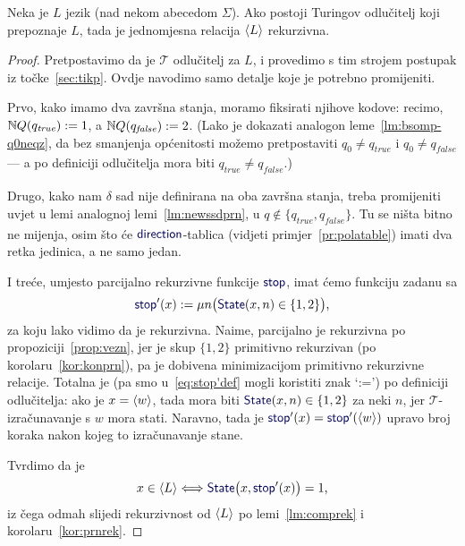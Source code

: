 \begin{teorem}[{name=[rekurzivnost Turing-odlučivog jezika]}]\label{tm:oikr}
    Neka je $L$ jezik (nad nekom abecedom $\Sigma$). Ako postoji Turingov odlučitelj koji prepoznaje $L$, tada je jednomjesna relacija $\langle L\rangle$ rekurzivna.
\end{teorem}
\begin{proof}
Pretpostavimo da je $\mathcal T$ odlučitelj za $L$, i provedimo s tim strojem postupak iz točke~\ref{sec:tikp}. Ovdje navodimo samo detalje koje je potrebno promijeniti.

Prvo, kako imamo dva završna stanja, moramo fiksirati njihove kodove: recimo, ${\mathbb N} Q(q_\mathit{true}):=1$, a ${\mathbb N} Q(q_\mathit{false}):=2$. (Lako je dokazati analogon leme~\ref{lm:bsomp-q0neqz}, da bez smanjenja općenitosti možemo pretpostaviti $q_0\not=q_\mathit{true}$ i $q_0\not=q_\mathit{false}$ --- a po definiciji odlučitelja mora biti $q_\mathit{true}\not=q_\mathit{false}$.)

    Drugo, kako nam $\delta$ sad nije definirana na oba završna stanja, treba promijeniti uvjet u lemi analognoj lemi~\ref{lm:newssdprn}, u $q\not\in\{q_\mathit{true},q_\mathit{false}\}$. Tu se ništa bitno ne mijenja, osim što će $\f{direction}$-tablica (vidjeti primjer~\ref{pr:polatable}) imati dva retka jedinica, a ne samo jedan.

I treće, umjesto parcijalno rekurzivne funkcije $\f{stop}$, imat ćemo funkciju zadanu sa
\begin{equation}\label{eq:stop'def}
    \f{stop}'(x):=\mu n\bigl(\f{State}(x,n)\in\{1,2\}\bigr)\text,
\end{equation}
za koju lako vidimo da je rekurzivna. Naime, parcijalno je rekurzivna po propoziciji~\ref{prop:vezn}, jer je skup $\{1,2\}$ primitivno rekurzivan (po korolaru~\ref{kor:konprn}), pa je dobivena minimizacijom primitivno rekurzivne relacije. Totalna je (pa smo u~\eqref{eq:stop'def} mogli koristiti znak `:=') po definiciji odlučitelja: ako je $x=\langle w\rangle$, tada mora biti $\f{State}(x,n)\in\{1,2\}$ za neki $n$, jer $\mathcal T$-izračunavanje s $w$ mora stati.
Naravno, tada je $\f{stop}'(x)=\f{stop}'(\kr w)$ upravo broj koraka nakon kojeg to iz\-ra\-ču\-na\-va\-nje stane.

Tvrdimo da je
\begin{equation}
    x\in\kr L\Longleftrightarrow\f{State}\bigl(x,\f{stop}'(x)\bigr)=1\text,
\end{equation}
iz čega odmah slijedi rekurzivnost od $\langle L\rangle$ po lemi~\ref{lm:comprek} i korolaru~\ref{kor:prnrek}. 


\end{proof}
